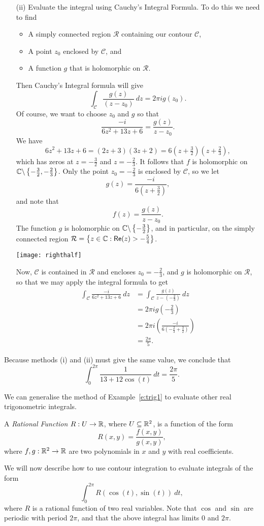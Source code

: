 \begin{enumerate}
\item[(ii)] Evaluate the integral using Cauchy's Integral Formula.  To do this we need to find
\begin{itemize}
\item A simply connected region $\mathcal{R}$ containing our contour $\mathcal{C}$,
\item A point $z_0$ enclosed by $\mathcal{C}$, and 
\item A function $g$ that is holomorphic on $\mathcal{R}$.
\end{itemize}
Then Cauchy's Integral formula will give
\[
\int_{\mathcal{C}} \frac{g(z)}{(z-z_0)}\ dz = 2 \pi i g(z_0).
\]
Of course, we want to choose $z_0$ and $g$ so that
\[
\frac{-i}{6z^2+13z+6} = \frac{g(z)}{z-z_0}.
\]
We have
\[
6z^2+13z+6 = (2z+3)(3z+2) = 6(z+\tfrac{3}{2})(z+\tfrac{2}{3}),
\]
which has zeros at $z=-\frac{3}{2}$ and $z= - \frac{2}{3}$.  It follows that $f$ is holomorphic on $\mathbb{C} \backslash \left\{ - \frac{3}{2},- \frac{2}{3}\right\}$.  Only the point $z_0=-\frac{2}{3}$ is enclosed by $\mathcal{C}$, so we let
\[
g(z)=  \frac{-i}{6(z+\frac{3}{2})},
\]
and note that
\[
f(z) = \frac{g(z)}{z-z_0}.
\]
The function $g$ is holomorphic on $\mathbb{C} \backslash \left\{- \frac{3}{2}\right\}$, and in particular, on the simply connected region $\mathcal{R} = \left\{ z \in \mathbb{C}: \textsf{Re} (z) > - \frac{5}{4}\right\}$.
\begin{center}
\texttt{[image: righthalf]}
\end{center}
Now, $\mathcal{C}$ is contained in $\mathcal{R}$ and encloses $z_0=-\frac{2}{3}$, and $g$ is holomorphic on $\mathcal{R}$, so that we may apply the integral formula to get
\begin{align*}
\int_{\mathcal{C}} \frac{-i}{6z^2+13z+6}\ dz & = \int_{\mathcal{C}} \frac{g(z)}{z-(-\frac{2}{3})}\ dz \\
& = 2\pi i g (-\tfrac{2}{3}) \\
& = 2\pi i \left( \frac{-i}{6(-\frac{2}{3}+\frac{3}{2})} \right) \\
& = \frac{2\pi }{5}.
\end{align*}
\end{enumerate}
Because methods (i) and (ii) must give the same value, we conclude that
\[
\int_0^{2\pi} \frac{1}{13+12\cos(t)}\ dt = \frac{2\pi}{5}.
\]



We can generalise the method of Example~\ref{e:trig1} to evaluate other real trigonometric integrals.
\begin{definition}
A \emph{Rational Function} $R:U \to \mathbb{R}$, where $U \subseteq \mathbb{R}^2$, is a function of the form
\[
R(x,y) = \frac{f(x,y)}{g(x,y)},
\]
where $f,g: \mathbb{R}^2 \to \mathbb{R}$ are two polynomials in $x$ and $y$ with real coefficients.
\end{definition}
We will now describe how to use contour integration to evaluate integrals of the form
\[
\int_0^{2\pi} R( \cos (t), \sin (t) )\ dt,
\]
where $R$ is a rational function of two real variables.  Note that $\cos$ and $\sin$ are periodic with period $2\pi$, and that the above integral has limits $0$ and $2\pi$.





